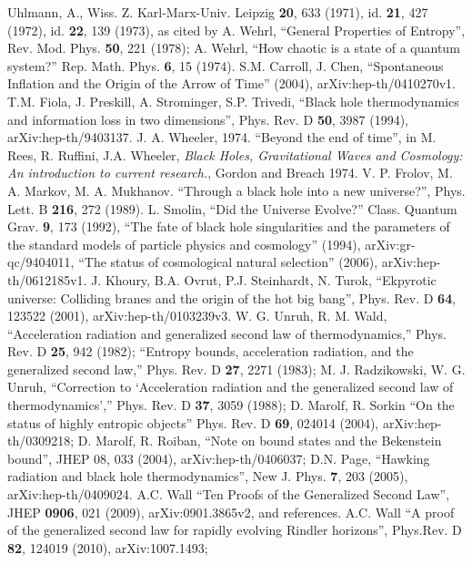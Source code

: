\documentclass[12pt]{article}
\begin{document}
\begin{thebibliography}{99}
Uhlmann, A., Wiss. Z. Karl-Marx-Univ. Leipzig \textbf{20}, 633 (1971), id. \textbf{21}, 427 (1972), id. \textbf{22}, 139 (1973), as cited by A. Wehrl, ``General Properties of Entropy'', Rev. Mod. Phys. \textbf{50}, 221 (1978); A. Wehrl, ``How chaotic is a state of a quantum system?'' Rep. Math. Phys. \textbf{6}, 15 (1974).
S.M. Carroll, J. Chen, ``Spontaneous Inflation and the Origin of the Arrow of Time'' (2004), arXiv:hep-th/0410270v1.
T.M. Fiola, J. Preskill, A. Strominger, S.P. Trivedi, ``Black hole thermodynamics and information loss in two dimensions'', Phys. Rev. D \textbf{50}, 3987 (1994), arXiv:hep-th/9403137.
J. A. Wheeler, 1974. ``Beyond the end of time'', in M. Rees, R. Ruffini, J.A. Wheeler, \textit{Black Holes, Gravitational Waves and Cosmology: An introduction to current research.}, Gordon and Breach 1974.
V. P. Frolov, M. A. Markov, M. A. Mukhanov. ``Through a black hole into a new universe?'', Phys. Lett. B \textbf{216}, 272 (1989).
L. Smolin, ``Did the Universe Evolve?'' Class. Quantum Grav. \textbf{9}, 173 (1992), ``The fate of black hole singularities and the parameters of the standard models of particle physics and cosmology'' (1994), arXiv:gr-qc/9404011, ``The status of cosmological natural selection'' (2006), arXiv:hep-th/0612185v1.
J. Khoury, B.A. Ovrut, P.J. Steinhardt, N. Turok, ``Ekpyrotic universe: Colliding branes and the origin of the hot big bang'', Phys. Rev. D \textbf{64}, 123522 (2001), arXiv:hep-th/0103239v3.
W. G. Unruh, R. M. Wald, ``Acceleration radiation and generalized second law of thermodynamics,'' Phys. Rev. D \textbf{25}, 942 (1982);
``Entropy bounds, acceleration radiation, and the generalized second law,'' Phys. Rev. D \textbf{27}, 2271 (1983);
M. J. Radzikowski, W. G. Unruh, ``Correction to `Acceleration radiation and
the generalized second law of thermodynamics','' Phys. Rev. D \textbf{37}, 3059 (1988); 
D. Marolf, R. Sorkin ``On the status of highly entropic objects'' Phys. Rev. D \textbf{69}, 024014 (2004), arXiv:hep-th/0309218;
D. Marolf, R. Roiban, ``Note on bound states and the Bekenstein bound'', JHEP 08, 033 (2004), arXiv:hep-th/0406037; 
D.N. Page, ``Hawking radiation and black hole thermodynamics'', New J. Phys. \textbf{7}, 203 (2005), arXiv:hep-th/0409024.
A.C. Wall ``Ten Proofs of the Generalized Second Law'', JHEP \textbf{0906}, 021 (2009), arXiv:0901.3865v2, and references.
A.C. Wall ``A proof of the generalized second law for rapidly evolving Rindler horizons'', Phys.Rev. D \textbf{82}, 124019 (2010), arXiv:1007.1493; 

\end{thebibliography}
\end{document}
